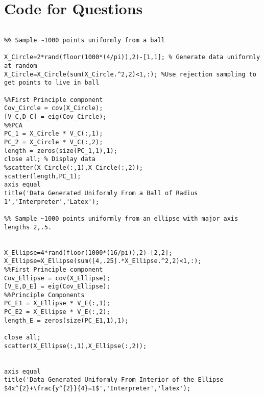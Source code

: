 \documentclass{article}
\begin{document}
\section*{Code for Questions}
\begin{tabular}{c|c}

\end{tabular}
\begin{lstlisting}
%% Sample ~1000 points uniformly from a ball

X_Circle=2*rand(floor(1000*(4/pi)),2)-[1,1]; % Generate data uniformly at random
X_Circle=X_Circle(sum(X_Circle.^2,2)<1,:); %Use rejection sampling to get points to live in ball

%%First Principle component
Cov_Circle = cov(X_Circle);
[V_C,D_C] = eig(Cov_Circle);
%%PCA
PC_1 = X_Circle * V_C(:,1);
PC_2 = X_Circle * V_C(:,2);
length = zeros(size(PC_1,1),1);
close all; % Display data
%scatter(X_Circle(:,1),X_Circle(:,2));
scatter(length,PC_1);
axis equal
title('Data Generated Uniformly From a Ball of Radius 1','Interpreter','Latex');

%% Sample ~1000 points uniformly from an ellipse with major axis lengths 2,.5.


X_Ellipse=4*rand(floor(1000*(16/pi)),2)-[2,2];
X_Ellipse=X_Ellipse(sum([4,.25].*X_Ellipse.^2,2)<1,:);
%%First Principle component
Cov_Ellipse = cov(X_Ellipse);
[V_E,D_E] = eig(Cov_Ellipse);
%%Principle Components
PC_E1 = X_Ellipse * V_E(:,1);
PC_E2 = X_Ellipse * V_E(:,2);
length_E = zeros(size(PC_E1,1),1);

close all;
scatter(X_Ellipse(:,1),X_Ellipse(:,2));


axis equal
title('Data Generated Uniformly From Interior of the Ellipse $4x^{2}+\frac{y^{2}}{4}=1$','Interpreter','latex');
         \end{lstlisting}
\end{document}
